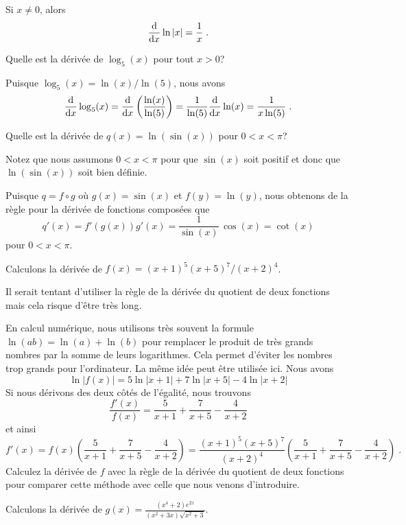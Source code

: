 {\begin{prop}
Si $x\neq 0$, alors
\[
\dfdx{\ln|x|}{x} = \frac{1}{x} \; .
\]
\end{prop}

\begin{egg}
Quelle est la dérivée de $\log_5(x)$ pour tout $x>0$?

Puisque $\log_5(x) = \ln(x)/\ln(5)$, nous avons
\[
\dfdx{\log_5(x)}{x} = \dfdx{\left(\frac{\ln(x)}{\ln(5)}\right)}{x}
= \frac{1}{\ln(5)} \dfdx{\ln(x)}{x}
= \frac{1}{x\ln(5)} \; .
\]
\end{egg}

\begin{egg}
Quelle est la dérivée de $q(x) = \ln( \sin(x) )$ pour $0 < x < \pi$?

Notez que nous assumons $0<x<\pi$ pour que $\sin(x)$ soit positif et
donc que $\ln(\sin(x))$ soit bien définie.

Puisque $q = f\circ g$ où $g(x) = \sin(x)$ et $f(y) = \ln(y)$, nous
obtenons de la règle pour la dérivée de fonctions composées que
\[
q'(x) = f'(g(x)) g'(x) = \frac{1}{\sin(x)} \, \cos(x)
= \cot(x)
\]
pour $0 < x < \pi$.
\end{egg}

\begin{egg}
Calculons la dérivée de $f(x) = (x+1)^5(x+5)^7/(x+2)^4$.

Il serait tentant d'utiliser la règle de la dérivée du quotient de
deux fonctions mais cela risque d'être très long.

En calcul numérique, nous utilisons très souvent la formule
$\ln(ab) = \ln(a)+\ln(b)$ pour remplacer le produit de très
grands nombres par la somme de leurs logarithmes.  Cela permet
d'éviter les nombres trop grands pour l'ordinateur.
La même idée peut être utilisée ici.  Nous avons
\[
\ln|f(x)| = 5\ln|x+1| + 7\ln|x+5| - 4\ln|x+2|
\]
Si nous dérivons des deux côtés de l'égalité, nous trouvons
\[
\frac{f'(x)}{f(x)} = \frac{5}{x+1} + \frac{7}{x+5} - \frac{4}{x+2}
\]
et ainsi
\[
f'(x) = f(x) \left(\frac{5}{x+1} + \frac{7}{x+5} - \frac{4}{x+2} \right)
= \frac{(x+1)^5(x+5)^7}{(x+2)^4}
\left(\frac{5}{x+1} + \frac{7}{x+5} - \frac{4}{x+2} \right) \; .
\]
Calculez la dérivée de $f$ avec la règle de la dérivée du quotient de
deux fonctions pour comparer cette méthode avec celle que nous venons
d'introduire.
\end{egg}

\begin{egg}
Calculons la dérivée de
$\displaystyle g(x) = \frac{(x^4+2)e^{2x}}{(x^2+3x)\sqrt{x^2+3}}$.


\end{egg}}
